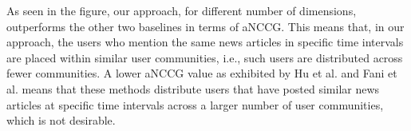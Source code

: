 \documentclass[sigconf]{acmart}
\begin{document}
As seen in the figure, our approach, for different number of dimensions, outperforms the other two baselines in terms of aNCCG. This means that, in our approach, the users who mention the same news articles in specific time intervals are placed within similar user communities, i.e., such users are distributed across fewer communities. A lower aNCCG value as exhibited by Hu et al. and Fani et al. means that these methods distribute users that have posted similar news articles at specific time intervals across a larger number of user communities, which is not desirable.


 
\end{document}
